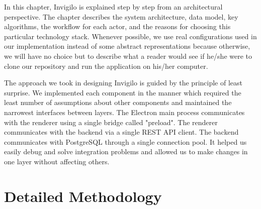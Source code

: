 \documentclass[12pt, a4paper]{report}
\begin{document}
\begin{justify}
  {\fontsize{12}{18}\selectfont
    In this chapter, Invigilo is explained step by step from an architectural perspective. The chapter describes the system architecture, data model, key algorithms, the workflow for each actor, and the reasons for choosing this particular technology stack. Whenever possible, we use real configurations used in our implementation instead of some abstract representations because otherwise, we will have no choice but to describe what a reader would see if he/she were to clone our repository and run the application on his/her computer.

   The approach we took in designing Invigilo is guided by the principle of least surprise. We implemented each component in the manner which required the least number of assumptions about other components and maintained the narrowest interfaces between layers. The Electron main process communicates with the renderer using a single bridge called "preload". The renderer communicates with the backend via a single REST API client. The backend communicates with PostgreSQL through a single connection pool. It helped us easily debug and solve integration problems and allowed us to make changes in one layer without affecting others.
  }
\end{justify}

\section{Detailed Methodology}
\end{document}
